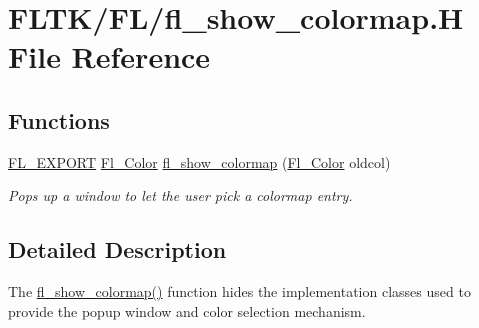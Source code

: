 \hypertarget{fl__show__colormap_8_h}{}\section{F\+L\+T\+K/\+F\+L/fl\+\_\+show\+\_\+colormap.H File Reference}
\label{fl__show__colormap_8_h}
\subsection*{Functions}
\begin{DoxyCompactItemize}
\item 
\hyperlink{_fl___export_8_h_aa9ba29a18aee9d738370a06eeb4470fc}{F\+L\+\_\+\+E\+X\+P\+O\+RT} \hyperlink{_enumerations_8_h_a8b762953646f8abee866061f1af78a6a}{Fl\+\_\+\+Color} \hyperlink{group__fl__attributes_ga497a7e059e9f5c89feed24ab0b1338f2}{fl\+\_\+show\+\_\+colormap} (\hyperlink{_enumerations_8_h_a8b762953646f8abee866061f1af78a6a}{Fl\+\_\+\+Color} oldcol)
\begin{DoxyCompactList}\small\item\em Pops up a window to let the user pick a colormap entry. \end{DoxyCompactList}\end{DoxyCompactItemize}


\subsection{Detailed Description}
The \hyperlink{group__fl__attributes_ga497a7e059e9f5c89feed24ab0b1338f2}{fl\+\_\+show\+\_\+colormap()} function hides the implementation classes used to provide the popup window and color selection mechanism. 